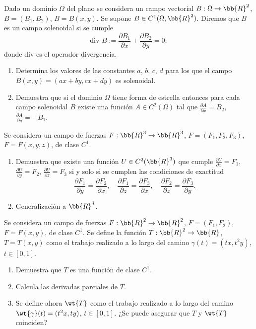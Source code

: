 \begin{ejercicio}
    Dado un dominio $\Omega$ del plano se considera un campo vectorial $B : \Omega \to \bb{R}^2$, $B = (B_1, B_2)$, $B = B(x, y)$. Se supone
    $B \in C^1(\Omega, \bb{R}^2)$. Diremos que $B$ es un campo solenoidal si se cumple
    \[
        \text{div } B := \frac{\partial B_1}{\partial x} + \frac{\partial B_2}{\partial y} = 0,
    \]
    donde $\text{div}$ es el operador divergencia.
    \begin{enumerate}
        \item Determina los valores de las constantes $a$, $b$, $c$, $d$ para los que el campo $B(x, y) = (ax+by, cx+dy)$ es solenoidal.
        \item Demuestra que si el dominio $\Omega$ tiene forma de estrella entonces para cada campo solenoidal $B$ existe una
        función $A \in C^2(\Omega)$ tal que $\frac{\partial A}{\partial x} = B_2$, $\frac{\partial A}{\partial y} = -B_1$.
    \end{enumerate}
\end{ejercicio}

\begin{ejercicio}
    Se considera un campo de fuerzas $F : \bb{R}^3 \to \bb{R}^3$, $F = (F_1, F_2, F_3)$, $F = F(x, y, z)$, de clase $C^1$.
    \begin{enumerate}
        \item Demuestra que existe una función $U \in C^2(\bb{R}^3)$ que cumple $\frac{\partial U}{\partial x} = F_1$,
        $\frac{\partial U}{\partial y} = F_2$, $\frac{\partial U}{\partial z} = F_3$ si y solo si se cumplen
        las condiciones de exactitud
        \[
            \frac{\partial F_1}{\partial y} = \frac{\partial F_2}{\partial x}, \quad
            \frac{\partial F_1}{\partial z} = \frac{\partial F_3}{\partial x}, \quad
            \frac{\partial F_2}{\partial z} = \frac{\partial F_3}{\partial y}.
        \]
        \item Generalización a $\bb{R}^d$.
    \end{enumerate}
\end{ejercicio}

\begin{ejercicio}
    Se considera un campo de fuerzas $F : \bb{R}^2 \to \bb{R}^2$, $F = (F_1, F_2)$, $F = F(x, y)$, de clase $C^1$. Se define la función
    $T : \bb{R}^2 \to \bb{R}$, $T = T(x, y)$ como el trabajo realizado a lo largo del camino $\gamma(t) = (tx, t^2y)$, $t \in [0, 1]$.
    \begin{enumerate}
        \item Demuestra que $T$ es una función de clase $C^1$.
        \item Calcula las derivadas parciales de $T$.
        \item Se define ahora $\wt{T}$ como el trabajo realizado a lo largo del camino $\wt{\gamma}(t) = (t^2x, ty)$, $t \in [0, 1]$. ¿Se puede asegurar
        que $T$ y $\wt{T}$ coinciden?
    \end{enumerate}
\end{ejercicio}